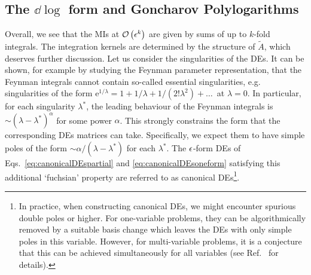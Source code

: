 \documentclass[main.tex]{subfiles}
\begin{document}
\subsection{The $\dd \log$ form and Goncharov Polylogarithms} \label{sec:DEdlogform}
Overall, we see that the MIs at $\mathcal{O}\left(\epsilon^k\right)$ are given by sums of up to $k$-fold integrals. The integration kernels are determined by the structure of $\tilde{A}$, which deserves further discussion. Let us consider the singularities of the DEs. It can be shown, for example by studying the Feynman parameter representation, that the Feynman integrals cannot contain so-called essential singularities, e.g. singularities of the form $\mathrm{e}^{1/\lambda} = 1+ 1/\lambda + 1/(2!\lambda^2)+\ldots\,$ at $\lambda=0$. In particular, for each singularity $\lambda^\ast$, the leading behaviour of the Feynman integrals is $\sim (\lambda- \lambda^\ast)^\alpha$ for some power $\alpha$. This strongly constrains the form that the corresponding DEs matrices can take\cite{Henn:2014qga}. Specifically, we expect them to have simple poles of the form $\sim \alpha/(\lambda-\lambda^\ast)$ for each $\lambda^\ast$. The $\epsilon$-form DEs of Eqs.~\ref{eq:canonicalDEspartial} and \ref{eq:canonicalDEsoneform} satisfying this additional `fuchsian' property are referred to as canonical DEs\footnote{In practice, when constructing canonical DEs, we might encounter spurious double poles or higher. For one-variable problems, they can be algorithmically removed by a suitable basis change which leaves the DEs with only simple poles in this variable. However, for multi-variable problems, it is a conjecture that this can be achieved simultaneously for all variables (see Ref.~\cite{Dlapa:2022nct} for details).}.
\end{document}
